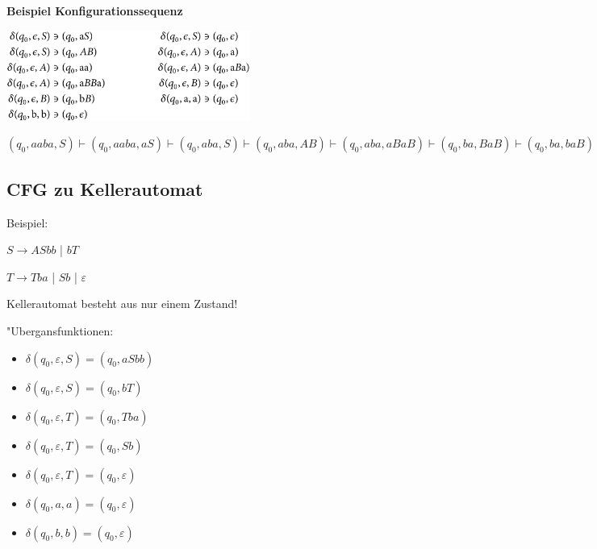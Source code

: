 \documentclass[11pt, a4paper]{scrartcl}
\begin{document}
\textbf{Beispiel Konfigurationssequenz}

\vspace{1em}

\includegraphics[width=0.6\textwidth]{PDA-00.png}

\vspace{1em}

$(q_0, aaba, S) \vdash (q_0, aaba, aS) \vdash (q_0, aba, S) \vdash (q_0, aba, AB) \vdash (q_0, aba, aBaB) \vdash (q_0, ba, BaB) \vdash (q_0, ba, baB) \vdash (q_0, a, aB) \vdash (q_0, \varepsilon, B) \vdash (q_0, \varepsilon, \varepsilon)$

\vspace{10em}

\subsection{CFG zu Kellerautomat}

Beispiel:

\vspace{0.5em}

$S \rightarrow ASbb$ | $bT$

$T \rightarrow Tba$ | $Sb$ | $\varepsilon$

\vspace{0.5em}

Kellerautomat besteht aus nur einem Zustand!

\vspace{0.5em}

"Ubergansfunktionen:
\begin{itemize}
    \item $\delta(q_0, \varepsilon, S) = (q_0, aSbb)$
    \item $\delta(q_0, \varepsilon, S) = (q_0, bT)$
    \item $\delta(q_0, \varepsilon, T) = (q_0, Tba)$
    \item $\delta(q_0, \varepsilon, T) = (q_0, Sb)$
    \item $\delta(q_0, \varepsilon, T) = (q_0, \varepsilon)$
    \item $\delta(q_0, a, a) = (q_0, \varepsilon)$
    \item $\delta(q_0, b, b) = (q_0, \varepsilon)$
\end{itemize}
\end{document}
